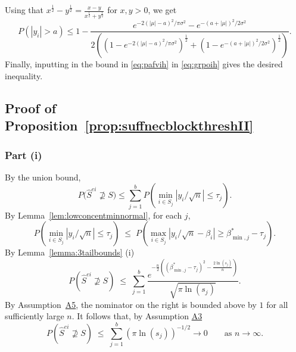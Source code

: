 \documentclass[
  12pt]{article}
\begin{document}
Using that $x^{\frac{1}{2}}-y^{\frac{1}{2}}=\frac{x-y}{x^{\frac{1}{2}}+y^{\frac{1}{2}}}$ for $x,y>0$, we get
 \begin{equation}\label{eq:pafvih}
    P(|y_i|>a) \leq 1- \frac{e^{-2(|\mu|-a)^2/\pi\sigma^2}-e^{-(a+|\mu|)^2/2\sigma^2}}{2\left(\left(1-e^{-2(|\mu|-a)^2/\pi\sigma^2}\right)^{\frac{1}{2}}+\left(1-e^{-(a+|\mu|)^2/2\sigma^2}\right)^{\frac{1}{2}}\right)}. 
 \end{equation}
Finally, inputting in the bound in \eqref{eq:pafvih} in \eqref{eq:grpoih} gives the desired inequality.

\subsection{Proof of Proposition~\ref{prop:suffnecblockthreshII}}

\subsubsection{Part (i)}
	 By the union bound, 
	$$P\big(\hat{S}^{ei} \not\supseteq S\big)\leq \sum_{j=1}^b  P\left(\min_{i\in S_j}|y_i/\sqrt{n}|\leq\tau_j\right).$$ 
	By Lemma~\ref{lem:lowconcentminnormal}, for each $j$,	
	$$P\left(\min_{i\in S_j}|y_i/\sqrt{n}|\leq\tau_j\right)\;\leq\; P\left(\max_{i\in S_j}|y_i/\sqrt{n}-\beta_i| \geq\beta_{\min,j}^*-\tau_j \right).$$ By Lemma~\ref{lemma:3tailbounds} (i)
	\begin{equation}\label{eq:type2convrate}
P\left(\hat{S}^{ei}\not\supseteq S \right) \;\leq\;\sum_{j=1}^b\frac{e^{-\tfrac{n}{2}\left((\beta^*_{\min,j}-\tau_j)^2-\tfrac{2\ln(s_j)}{n}\right)}}{\sqrt{\pi\ln(s_j)}}.		
	\end{equation}
 By Assumption~\hyperlink{lab:A5}{A5}, the nominator on the right is bounded above by $1$ for all sufficiently large $n$. It follows that, by Assumption \hyperlink{lab:A3}{A3} 
	$$P\left(\hat{S}^{ei} \not\supseteq S \right) \;\leq\;  \sum_{j=1}^b (\pi\ln (s_j))^{-1/2} \to 0\qquad \mbox{as } n\to \infty.$$ 
\end{document}
